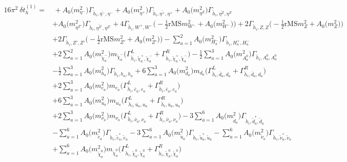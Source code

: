 \begin{align} 
16\pi^2 \ \delta t^{(1)}_{h} = & \, +{A_0\Big(m^2_{\eta^-}\Big)} {\Gamma_{\check{h}_{{i}},\bar{\eta^-},\eta^-}} +{A_0\Big(m^2_{\eta^+}\Big)} {\Gamma_{\check{h}_{{i}},\bar{\eta^+},\eta^+}} +{A_0\Big(m^2_{\eta^Z}\Big)} {\Gamma_{\check{h}_{{i}},\bar{\eta^Z},\eta^Z}} \nonumber \\ 
 &+{A_0\Big(m^2_{\eta^{Z'}}\Big)} {\Gamma_{\check{h}_{{i}},\bar{\eta^{Z'}},\eta^{Z'}}} +4 {\Gamma_{\check{h}_{{i}},W^+,W^-}} \Big(-\frac{1}{2} \text{rMS} m^2_{W^-}  + {A_0\Big(m^2_{W^-}\Big)}\Big)+2 {\Gamma_{\check{h}_{{i}},Z,Z}} \Big(-\frac{1}{2} \text{rMS} m^2_{Z}  + {A_0\Big(m^2_{Z}\Big)}\Big)\nonumber \\ 
 &+2 {\Gamma_{\check{h}_{{i}},{Z'},{Z'}}} \Big(-\frac{1}{2} \text{rMS} m^2_{{Z'}}  + {A_0\Big(m^2_{{Z'}}\Big)}\Big)- \sum_{a=1}^{2}{A_0\Big(m^2_{H^-_{{a}}}\Big)} {\Gamma_{\check{h}_{{i}},H^+_{{a}},H^-_{{a}}}}  \nonumber \\ 
 &+2 \sum_{a=1}^{2}{A_0\Big(m^2_{\tilde{\chi}^-_{{a}}}\Big)} m_{\tilde{\chi}^-_{{a}}} \Big({\Gamma^L_{\check{h}_{{i}},\tilde{\chi}^+_{{a}},\tilde{\chi}^-_{{a}}}} + {\Gamma^R_{\check{h}_{{i}},\tilde{\chi}^+_{{a}},\tilde{\chi}^-_{{a}}}}\Big) -\frac{1}{2} \sum_{a=1}^{3}{A_0\Big(m^2_{A^0_{{a}}}\Big)} {\Gamma_{\check{h}_{{i}},A^0_{{a}},A^0_{{a}}}}  \nonumber \\ 
 &-\frac{1}{2} \sum_{a=1}^{3}{A_0\Big(m^2_{h_{{a}}}\Big)} {\Gamma_{\check{h}_{{i}},h_{{a}},h_{{a}}}}  +6 \sum_{a=1}^{3}{A_0\Big(m^2_{d_{{a}}}\Big)} m_{d_{{a}}} \Big({\Gamma^L_{\check{h}_{{i}},\bar{d}_{{a}},d_{{a}}}} + {\Gamma^R_{\check{h}_{{i}},\bar{d}_{{a}},d_{{a}}}}\Big) \nonumber \\ 
 &+2 \sum_{a=1}^{3}{A_0\Big(m^2_{e_{{a}}}\Big)} m_{e_{{a}}} \Big({\Gamma^L_{\check{h}_{{i}},\bar{e}_{{a}},e_{{a}}}} + {\Gamma^R_{\check{h}_{{i}},\bar{e}_{{a}},e_{{a}}}}\Big) \nonumber \\ 
 &+6 \sum_{a=1}^{3}{A_0\Big(m^2_{u_{{a}}}\Big)} m_{u_{{a}}} \Big({\Gamma^L_{\check{h}_{{i}},\bar{u}_{{a}},u_{{a}}}} + {\Gamma^R_{\check{h}_{{i}},\bar{u}_{{a}},u_{{a}}}}\Big) \nonumber \\ 
 &+2 \sum_{a=1}^{3}{A_0\Big(m^2_{\nu_{{a}}}\Big)} m_{\nu_{{a}}} \Big({\Gamma^L_{\check{h}_{{i}},\bar{\nu}_{{a}},\nu_{{a}}}} + {\Gamma^R_{\check{h}_{{i}},\bar{\nu}_{{a}},\nu_{{a}}}}\Big) -3 \sum_{a=1}^{6}{A_0\Big(m^2_{\tilde{d}_{{a}}}\Big)} {\Gamma_{\check{h}_{{i}},\tilde{d}^*_{{a}},\tilde{d}_{{a}}}}  \nonumber \\ 
 &- \sum_{a=1}^{6}{A_0\Big(m^2_{\tilde{e}_{{a}}}\Big)} {\Gamma_{\check{h}_{{i}},\tilde{e}^*_{{a}},\tilde{e}_{{a}}}}  -3 \sum_{a=1}^{6}{A_0\Big(m^2_{\tilde{u}_{{a}}}\Big)} {\Gamma_{\check{h}_{{i}},\tilde{u}^*_{{a}},\tilde{u}_{{a}}}}  - \sum_{a=1}^{6}{A_0\Big(m^2_{\tilde{\nu}_{{a}}}\Big)} {\Gamma_{\check{h}_{{i}},\tilde{\nu}^*_{{a}},\tilde{\nu}_{{a}}}}  \nonumber \\ 
 &+\sum_{a=1}^{6}{A_0\Big(m^2_{\tilde{\chi}^0_{{a}}}\Big)} m_{\tilde{\chi}^0_{{a}}} \Big({\Gamma^L_{\check{h}_{{i}},\tilde{\chi}^0_{{a}},\tilde{\chi}^0_{{a}}}} + {\Gamma^R_{\check{h}_{{i}},\tilde{\chi}^0_{{a}},\tilde{\chi}^0_{{a}}}}\Big) 
\end{align} 
